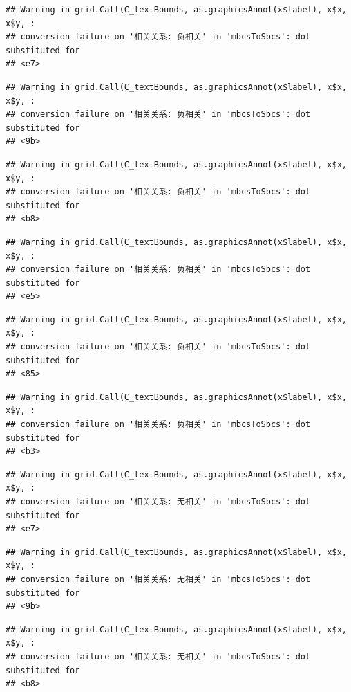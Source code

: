\documentclass[
]{book}
\begin{document}
\begin{verbatim}
## Warning in grid.Call(C_textBounds, as.graphicsAnnot(x$label), x$x, x$y, :
## conversion failure on '相关关系: 负相关' in 'mbcsToSbcs': dot substituted for
## <e7>
\end{verbatim}

\begin{verbatim}
## Warning in grid.Call(C_textBounds, as.graphicsAnnot(x$label), x$x, x$y, :
## conversion failure on '相关关系: 负相关' in 'mbcsToSbcs': dot substituted for
## <9b>
\end{verbatim}

\begin{verbatim}
## Warning in grid.Call(C_textBounds, as.graphicsAnnot(x$label), x$x, x$y, :
## conversion failure on '相关关系: 负相关' in 'mbcsToSbcs': dot substituted for
## <b8>
\end{verbatim}

\begin{verbatim}
## Warning in grid.Call(C_textBounds, as.graphicsAnnot(x$label), x$x, x$y, :
## conversion failure on '相关关系: 负相关' in 'mbcsToSbcs': dot substituted for
## <e5>
\end{verbatim}

\begin{verbatim}
## Warning in grid.Call(C_textBounds, as.graphicsAnnot(x$label), x$x, x$y, :
## conversion failure on '相关关系: 负相关' in 'mbcsToSbcs': dot substituted for
## <85>
\end{verbatim}

\begin{verbatim}
## Warning in grid.Call(C_textBounds, as.graphicsAnnot(x$label), x$x, x$y, :
## conversion failure on '相关关系: 负相关' in 'mbcsToSbcs': dot substituted for
## <b3>
\end{verbatim}

\begin{verbatim}
## Warning in grid.Call(C_textBounds, as.graphicsAnnot(x$label), x$x, x$y, :
## conversion failure on '相关关系: 无相关' in 'mbcsToSbcs': dot substituted for
## <e7>
\end{verbatim}

\begin{verbatim}
## Warning in grid.Call(C_textBounds, as.graphicsAnnot(x$label), x$x, x$y, :
## conversion failure on '相关关系: 无相关' in 'mbcsToSbcs': dot substituted for
## <9b>
\end{verbatim}

\begin{verbatim}
## Warning in grid.Call(C_textBounds, as.graphicsAnnot(x$label), x$x, x$y, :
## conversion failure on '相关关系: 无相关' in 'mbcsToSbcs': dot substituted for
## <b8>
\end{verbatim}
\end{document}
